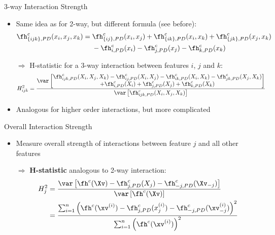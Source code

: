 \documentclass[11pt,compress,t,notes=noshow, aspectratio=169, xcolor=table]{beamer}
\begin{document}
\begin{frame}{3-way Interaction Strength}
\begin{itemize}
    \item Same idea as for 2-way, but different formula (see before): %
    \begin{align*}
        \fh^c_{\{ijk\}, PD}(x_i, x_j, x_k)
        =\; & \fh^c_{\{ij\}, PD}(x_i, x_j) + \fh^c_{\{ik\}, PD}(x_i, x_k) + \fh^c_{\{jk\}, PD}(x_j, x_k) \\
        & - \fh^c_{i, PD}(x_i) - \fh^c_{j, PD}(x_j) - \fh^c_{k, PD}(x_k)
    \end{align*}
    \item[$\Rightarrow$] H-statistic for a 3-way interaction between features $i$, $j$ and $k$:
    \begin{align*}
        H^2_{ijk}
        & = \frac{ \var \left[ \substack{\textstyle
        \fh^c_{ijk, PD}(X_i, X_j, X_k)
        - \fh^c_{ij, PD}(X_i, X_j) - \fh^c_{ik, PD}(X_i, X_k) - \fh^c_{jk, PD}(X_j, X_k) \\ \textstyle
        + \fh^c_{i, PD}(X_i) + \fh^c_{j, PD}(X_j) + \fh^c_{k, PD}(X_k)
        }
        \right]
        }{ \var \left[ \fh^c_{ijk, PD}(X_i, X_j, X_k) \right] }
    \end{align*}
    \item Analogous for higher order interactions, but more complicated
\end{itemize}
\end{frame}



\begin{frame}{Overall Interaction Strength}

\begin{itemize}
    \item Measure overall strength of interactions between feature $j$ and all other features
    \item[$\Rightarrow$] \textbf{H-statistic} analogous to 2-way interaction:
    \begin{align*}
        H^2_{j}
        & = \frac{
            \var \left[ \fh^c(\Xv) - \fh^c_{j, PD}(X_j) - \fh^c_{-j, PD}(\Xv_{-j}) \right]
        }{ \var \left[ \fh^c(\Xv) \right] } \\
        & = \frac{
            \sum_{i=1}^n \left( \fh^c(\xv^{(i)}) - \fh^c_{j, PD}(x_j^{(i)}) - \fh^c_{-j, PD}(\xv_{-j}^{(i)})  \right)^2
        }{
            \sum_{i=1}^n \left( \fh^c(\xv^{(i)}) \right)^2
        }
    \end{align*}
\end{itemize}


\end{frame}
\end{document}
